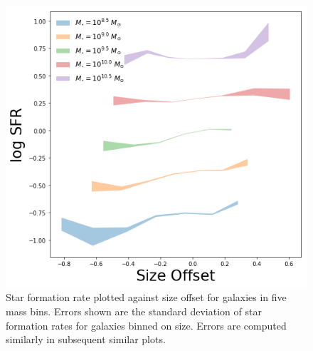\documentclass[iop]{emulateapj}
\begin{document}

	


\begin{figure}
	\centering
	\includegraphics[width=1.5 \columnwidth]{ha_lum.png}
	\caption{Star formation rate plotted against size offset for galaxies in five mass bins. Errors shown are the standard deviation of star formation rates for galaxies binned on size. Errors are computed similarly in subsequent similar plots.}
     \label{fig:sfr}

\end{figure}
\end{document}
